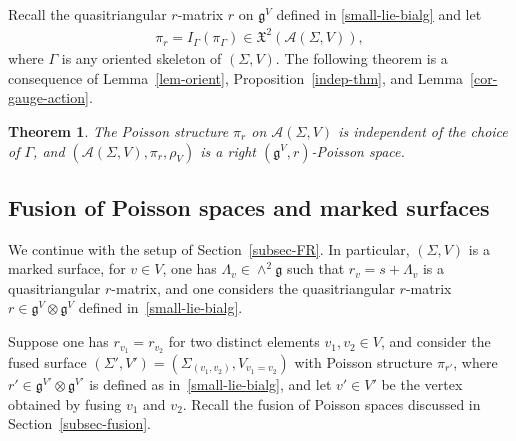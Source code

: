 \documentclass[10pt,a4paper]{amsart}
\numberwithin{equation}{section}
\newtheorem{Theorem}{Theorem}[section]
\newcommand{\XX}{\mathfrak{X}}
\def \g {\mathfrak{a}}
\def \g {\mathfrak{g}}
\def \A {{\mathcal{A}}}
\def \sV {{\scriptscriptstyle V}}
\def \sGam {{\scriptscriptstyle \Gamma}}
\begin{document}
Recall the quasitriangular $r$-matrix $r$ on $\g^{\sV}$ def\/ined in \eqref{small-lie-bialg} and let
\begin{gather*}
\pi_r = I_\Gamma(\pi_{\sGam}) \in \XX^2(\A(\Sigma, V)),
\end{gather*}
where $\Gamma$ is any oriented skeleton of $(\Sigma, V)$. The following theorem is a consequence of Lemma~\ref{lem-orient}, Proposition~\ref{indep-thm}, and Lemma~\ref{cor-gauge-action}.

\begin{Theorem} \label{main-thm-2}The Poisson structure $\pi_r$ on $\A(\Sigma, V)$ is independent of the choice of $\Gamma$, and $(\A(\Sigma, V), \pi_r, \rho_{\sV})$ is a right $(\g^{\sV}, r)$-Poisson space.
\end{Theorem}

\subsection{Fusion of Poisson spaces and marked surfaces} \label{subsec-fus}

We continue with the setup of Section~\ref{subsec-FR}. In particular, $(\Sigma, V)$ is a marked surface, for $v \in V$, one has $\Lambda_v \in \wedge^2 \g$ such that $r_v = s + \Lambda_v$ is a quasitriangular $r$-matrix, and one considers the quasitriangular $r$-matrix $r \in \g^{\sV} \otimes \g^{\sV}$ def\/ined in~\eqref{small-lie-bialg}.

Suppose one has $r_{v_1} = r_{v_2}$ for two distinct elements $v_1, v_2 \in V$, and consider the fused surface $(\Sigma', V') = (\Sigma_{(v_1, v_2)}, V_{v_1 = v_2})$ with Poisson structure $\pi_{r'}$, where $r' \in \g^{\sV'} \otimes \g^{\sV'}$ is def\/ined as in~\eqref{small-lie-bialg}, and let $v' \in V'$ be the vertex obtained by fusing $v_1$ and $v_2$. Recall the fusion of Poisson spaces discussed in Section~\ref{subsec-fusion}.
\end{document}
